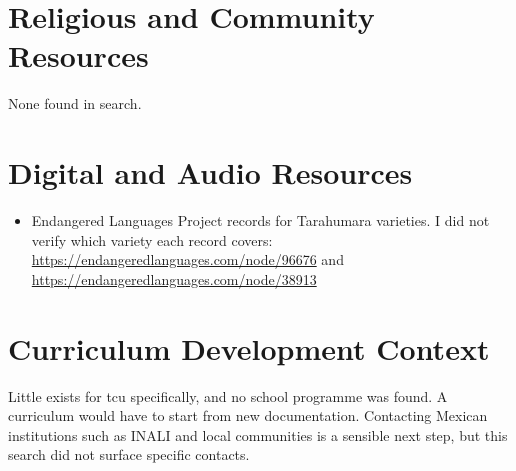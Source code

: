\documentclass[12pt]{article}
\begin{document}
\section{Religious and Community Resources}
None found in search.

\section{Digital and Audio Resources}
\begin{itemize}
\item Endangered Languages Project records for Tarahumara varieties. I did not verify which variety each record covers: \url{https://endangeredlanguages.com/node/96676} and \url{https://endangeredlanguages.com/node/38913}
\end{itemize}

\section{Curriculum Development Context}
Little exists for tcu specifically, and no school programme was found. A curriculum would have to start from new documentation. Contacting Mexican institutions such as INALI and local communities is a sensible next step, but this search did not surface specific contacts.
\end{document}
